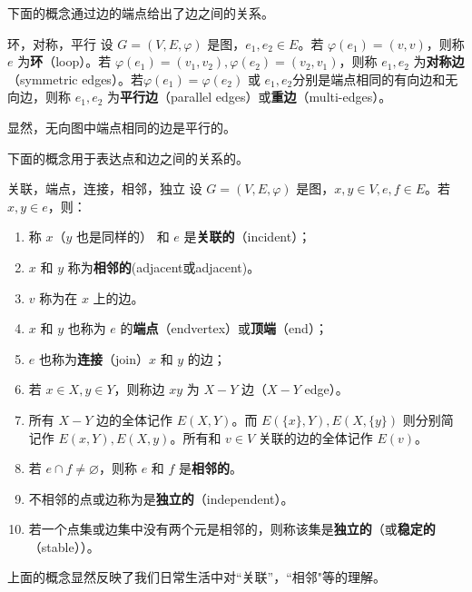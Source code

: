 下面的概念通过边的端点给出了边之间的关系。
\begin{definition}{环，对称，平行}
设 $G=(V,E,\varphi)$ 是图，$e_1,e_2\in E$。若 $\varphi(e_1)=(v,v)$，则称 $e$ 为\textbf{环}（loop）。若 $\varphi(e_1)=(v_1,v_2),\varphi(e_2)=(v_2,v_1)$，则称 $e_1,e_2$ 为\textbf{对称边}（symmetric edges）。若$\varphi(e_1)=\varphi(e_2)$ 或 $e_1,e_2$分别是端点相同的有向边和无向边，则称 $e_1,e_2$ 为\textbf{平行边}（parallel edges）或\textbf{重边}（multi-edges）。
\end{definition}
显然，无向图中端点相同的边是平行的。

下面的概念用于表达点和边之间的关系的。
\begin{definition}{关联，端点，连接，相邻，独立}
设 $G=(V,E,\varphi)$ 是图，$x,y\in V,e,f\in E$。若 $x,y\in e$，则：

 \begin{enumerate}
 \item 称 $x$（$y$ 也是同样的） 和 $e$ 是\textbf{关联的}（incident）；

   \item  $x$ 和 $y$ 称为\textbf{相邻的}(adjacent或adjacent)。

   \item $v$ 称为在 $x$ 上的边。
  
   \item $x$ 和 $y$ 也称为 $e$ 的\textbf{端点}（endvertex）或\textbf{顶端}（end）；
  
  \item  $e$ 也称为\textbf{连接}（join）$x$ 和 $y$ 的边；
  
   \item 若 $x\in X,y\in Y$，则称边 $xy$ 为 $X-Y$ 边（$X-Y$ edge）。
  
   \item 所有 $X-Y$ 边的全体记作 $E(X,Y)$。而 $E(\{x\},Y),E(X,\{y\})$ 则分别简记作 $E(x,Y),E(X,y)$。所有和 $v\in V$ 关联的边的全体记作 $E(v)$。

   \item 若 $e\cap f\neq\varnothing$，则称 $e$ 和 $f$ 是\textbf{相邻的}。

   \item 不相邻的点或边称为是\textbf{独立的}（independent）。
   
   \item 若一个点集或边集中没有两个元是相邻的，则称该集是\textbf{独立的}（或\textbf{稳定的}（stable））。
 \end{enumerate}
\end{definition}
上面的概念显然反映了我们日常生活中对“关联”，“相邻"等的理解。

